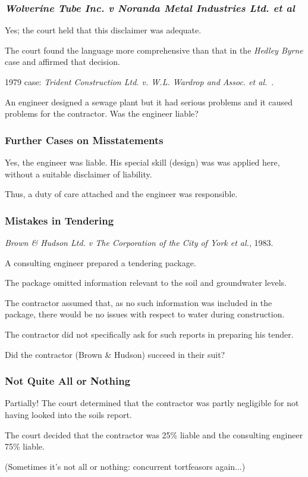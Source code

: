 \begin{frame}
\frametitle{\textit{Wolverine Tube Inc. v Noranda Metal Industries Ltd. et al}}

Yes; the court held that this disclaimer was adequate.

The court found the language more comprehensive than that in the \textit{Hedley Byrne} case and affirmed that decision.

1979 case: \textit{Trident Construction Ltd. v. W.L. Wardrop and Assoc. et al.}~\cite{lpe}.

An engineer designed a sewage plant but it had serious problems and it caused problems for the contractor. Was the engineer liable?

\end{frame}



\begin{frame}
\frametitle{Further Cases on Misstatements}

Yes, the engineer was liable. His special skill (design) was was applied here, without a suitable disclaimer of liability.

Thus, a duty of care attached and the engineer was responsible.

\end{frame}



\begin{frame}
\frametitle{Mistakes in Tendering}

\textit{Brown \& Hudson Ltd. v The Corporation of the City of York et al.}, 1983.

A consulting engineer prepared a tendering package.

The package omitted information relevant to the soil and groundwater levels.

The contractor assumed that, as no such information was included in the package, there would be no issues with respect to water during construction.

The contractor did not specifically ask for such reports in preparing his tender.

Did the contractor (Brown \& Hudson) succeed in their suit?

\end{frame}



\begin{frame}
\frametitle{Not Quite All or Nothing}

Partially! The court determined that the contractor was partly negligible for not having looked into the soils report.

The court decided that the contractor was 25\% liable and the consulting engineer 75\% liable.

(Sometimes it's not all or nothing: concurrent tortfeasors again...)

\end{frame}



